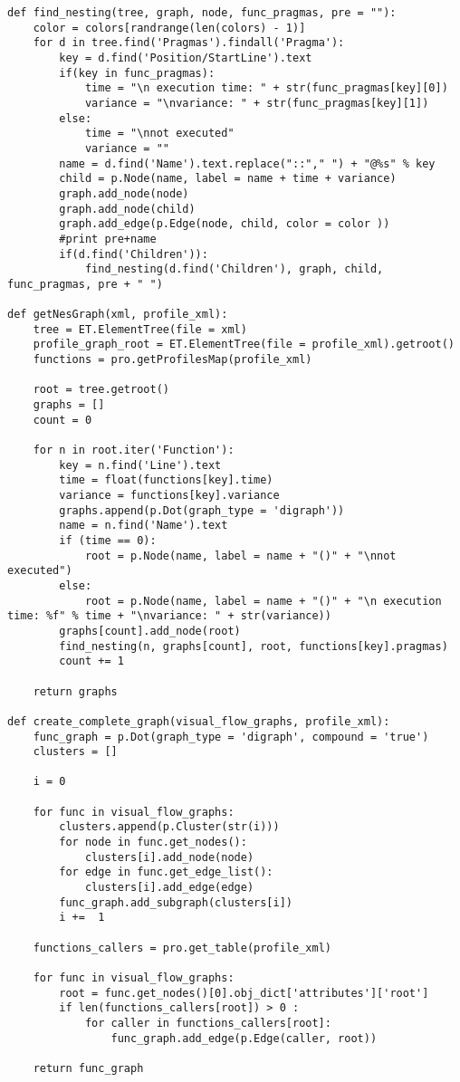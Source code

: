 \documentclass[a4paper,11pt,twoside]{book}
\begin{document}
\begin{lstlisting}[language=CCC, caption=pargraph.py]
def find_nesting(tree, graph, node, func_pragmas, pre = ""):
	color = colors[randrange(len(colors) - 1)]
	for d in tree.find('Pragmas').findall('Pragma'):
		key = d.find('Position/StartLine').text
		if(key in func_pragmas):
			time = "\n execution time: " + str(func_pragmas[key][0])
			variance = "\nvariance: " + str(func_pragmas[key][1])
		else:
			time = "\nnot executed"
			variance = ""
		name = d.find('Name').text.replace("::"," ") + "@%s" % key
		child = p.Node(name, label = name + time + variance)
		graph.add_node(node)
		graph.add_node(child)
		graph.add_edge(p.Edge(node, child, color = color ))
		#print pre+name
		if(d.find('Children')):
			find_nesting(d.find('Children'), graph, child, func_pragmas, pre + " ")

def getNesGraph(xml, profile_xml):
	tree = ET.ElementTree(file = xml) 
	profile_graph_root = ET.ElementTree(file = profile_xml).getroot()
	functions = pro.getProfilesMap(profile_xml)

	root = tree.getroot()
	graphs = []
	count = 0

	for n in root.iter('Function'):
		key = n.find('Line').text
		time = float(functions[key].time)
		variance = functions[key].variance
		graphs.append(p.Dot(graph_type = 'digraph'))
		name = n.find('Name').text
		if (time == 0):
			root = p.Node(name, label = name + "()" + "\nnot executed")
		else:
			root = p.Node(name, label = name + "()" + "\n execution time: %f" % time + "\nvariance: " + str(variance))
		graphs[count].add_node(root)
		find_nesting(n, graphs[count], root, functions[key].pragmas)
		count += 1

	return graphs

def create_complete_graph(visual_flow_graphs, profile_xml):
	func_graph = p.Dot(graph_type = 'digraph', compound = 'true')
	clusters = []

	i = 0

	for func in visual_flow_graphs:
		clusters.append(p.Cluster(str(i)))
		for node in func.get_nodes():
			clusters[i].add_node(node)
		for edge in func.get_edge_list():
			clusters[i].add_edge(edge)
		func_graph.add_subgraph(clusters[i])
		i +=  1

	functions_callers = pro.get_table(profile_xml)

	for func in visual_flow_graphs:
		root = func.get_nodes()[0].obj_dict['attributes']['root']
		if len(functions_callers[root]) > 0 :
			for caller in functions_callers[root]:
				func_graph.add_edge(p.Edge(caller, root))

	return func_graph


\end{lstlisting}
\end{document}
